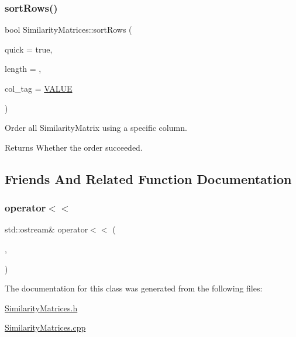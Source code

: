 \subsubsection{\texorpdfstring{sort\+Rows()}{sortRows()}}
{\footnotesize\ttfamily bool Similarity\+Matrices\+::sort\+Rows (\begin{DoxyParamCaption}\item[{bool}]{quick = {\ttfamily true},  }\item[{size\+\_\+t}]{length = {},  }\item[{\mbox{\hyperlink{class_similarity_matrices_a8fea56a2e7c8a9f692753c8f706e5706}{C\+O\+L\+\_\+\+T\+AG}}}]{col\+\_\+tag = {\ttfamily \mbox{\hyperlink{class_similarity_matrices_a8fea56a2e7c8a9f692753c8f706e5706a7e2e95a0186387323e96d06c26d90280}{V\+A\+L\+UE}}} }\end{DoxyParamCaption})}

Order all Similarity\+Matrix using a specific column.

\begin{DoxyReturn}{Returns}
Whether the order succeeded. 
\end{DoxyReturn}


\subsection{Friends And Related Function Documentation}
\mbox{\label{class_similarity_matrices_af149863a23588d5fe79dacef6d1a5edd}} 
\subsubsection{\texorpdfstring{operator$<$$<$}{operator<<}}
{\footnotesize\ttfamily std\+::ostream\& operator$<$$<$ (\begin{DoxyParamCaption}\item[{std\+::ostream \&}]{,  }\item[{const \mbox{\hyperlink{class_similarity_matrices}{Similarity\+Matrices}} \&}]{ }\end{DoxyParamCaption})\hspace{0.3cm}{\ttfamily [friend]}}



The documentation for this class was generated from the following files\+:\begin{DoxyCompactItemize}
\item 
\mbox{\hyperlink{_similarity_matrices_8h}{Similarity\+Matrices.\+h}}\item 
\mbox{\hyperlink{_similarity_matrices_8cpp}{Similarity\+Matrices.\+cpp}}\end{DoxyCompactItemize}
